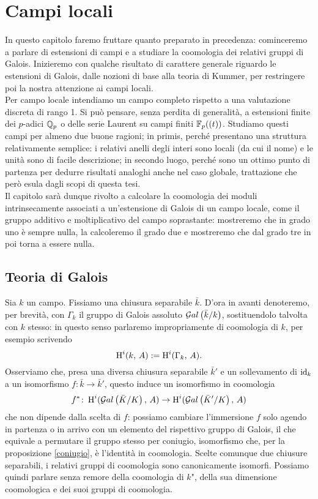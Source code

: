 \chapter{Campi locali}
In questo capitolo faremo fruttare quanto preparato in precedenza: cominceremo a parlare di estensioni di campi e a studiare la coomologia dei relativi gruppi di Galois. Inizieremo con qualche risultato di carattere generale riguardo le estensioni di Galois, dalle nozioni di base alla teoria di Kummer, per restringere poi la nostra attenzione ai campi locali. \\

Per campo locale intendiamo un campo completo rispetto a una valutazione discreta di rango 1. Si può pensare, senza perdita di generalità, a estensioni finite dei $ p $-adici $ \mathbb{Q}_p $ o delle serie Laurent su campi finiti $ \mathbb{F}_p((t)) $. Studiamo questi campi per almeno due buone ragioni; in primis, perché presentano una struttura relativamente semplice: i relativi anelli degli interi sono locali (da cui il nome) e le unità sono di facile descrizione; in secondo luogo, perché sono un ottimo punto di partenza per dedurre risultati analoghi anche nel caso globale, trattazione che però esula dagli scopi di questa tesi. \\

Il capitolo sarà dunque rivolto a calcolare la coomologia dei moduli intrinsecamente associati a un'estensione di Galois di un campo locale, come il gruppo additivo e moltiplicativo del campo soprastante: mostreremo che in grado uno è sempre nulla, la calcoleremo il grado due e mostreremo che dal grado tre in poi torna a essere nulla.

\section{Teoria di Galois}
Sia $ k $ un campo. Fissiamo una chiusura separabile $ \bar{k} $. D'ora in avanti denoteremo, per brevità, con $ \Gamma_k $ il gruppo di Galois assoluto $ \mathcal{G}al\left( \bar{k} / k \right) $, sostituendolo talvolta con $ k $ stesso: in questo senso parlaremo impropriamente di coomologia di $ k $, per esempio scrivendo
\[ \operatorname{H}^i(k, \, A) := \operatorname{H}^i(\Gamma_k, \, A). \]
Osserviamo che, presa una diversa chiusura separabile $ \bar{k}' $ e un sollevamento di $ \operatorname{id}_{k} $ a un isomorfismo $ f\colon \bar{k} \to \bar{k}' $, questo induce un isomorfismo in coomologia
\[ f^* \colon \operatorname{H}^i(\mathcal{G}al\left( \bar{K} / K \right), \, A) \to \operatorname{H}^i(\mathcal{G}al\left( \bar{K}' / K \right), \, A) \]
che non dipende  dalla scelta di $ f $: possiamo cambiare l'immersione $ f $ solo agendo in partenza o in arrivo con un elemento del rispettivo gruppo di Galois, il che equivale a permutare il gruppo stesso per coniugio, isomorfismo che, per la proposizione \ref{coniugio}, è l'identità in coomologia. Scelte comunque due chiusure separabili, i relativi gruppi di coomologia sono canonicamente isomorfi. Possiamo quindi parlare senza remore della \leftquote coomologia di $ k $", della sua dimensione coomologica e dei suoi gruppi di coomologia. \\

